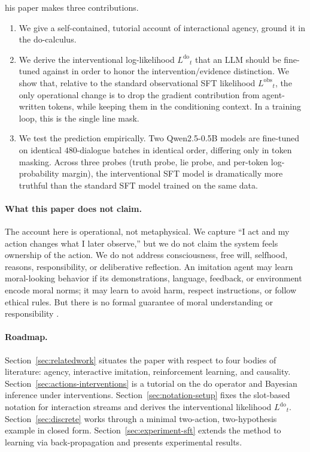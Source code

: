 \documentclass[11pt]{article}
\newcommand{\lik}{\ensuremath{L}}
\newcommand{\obslik}{\ensuremath{\lik^{\mathrm{obs}}}}
\newcommand{\dolik}{\ensuremath{\lik^{\mathrm{do}}}}
\begin{document}
his paper makes three contributions.
\begin{enumerate}[leftmargin=2em,itemsep=2pt]
  \item We give a self-contained, tutorial account of interactional agency, ground it in the do-calculus. 
  \item We derive the interventional log-likelihood $\dolik_t$ that an LLM should be fine-tuned against in order to honor the intervention/evidence distinction. We show that, relative to the standard observational SFT likelihood $\obslik_t$, the only operational change is to drop the gradient contribution from agent-written tokens, while keeping them in the conditioning context. In a training loop, this is the single line mask.
  \item We test the prediction empirically. Two Qwen2.5-0.5B models are fine-tuned on identical $480$-dialogue batches in identical order, differing only in token masking. Across three probes (truth probe, lie probe, and per-token log-probability margin), the interventional SFT model is dramatically more truthful than the standard SFT model trained on the same data.
\end{enumerate}

\paragraph{What this paper does not claim.} The account here is operational, not metaphysical. We capture ``I act and my action changes what I later observe,'' but we do not claim the system feels ownership of the action. We do not address consciousness, free will, selfhood, reasons, responsibility, or deliberative reflection. An imitation agent may learn moral-looking behavior if its demonstrations, language, feedback, or environment encode moral norms; it may learn to avoid harm, respect instructions, or follow ethical rules. But there is no formal guarantee of moral understanding or responsibility \citep{wikiAgencyPhilosophy}.

\paragraph{Roadmap.} Section~\ref{sec:relatedwork} situates the paper with respect to four bodies of literature: agency, interactive imitation, reinforcement learning, and causality. Section~\ref{sec:actions-interventions} is a tutorial on the do operator and Bayesian inference under interventions. Section~\ref{sec:notation-setup} fixes the slot-based notation for interaction streams and derives the interventional likelihood $\dolik_t$. Section~\ref{sec:discrete} works through a minimal two-action, two-hypothesis example in closed form. Section~\ref{sec:experiment-sft} extends the method to learning via back-propagation and presents experimental results.
\end{document}
